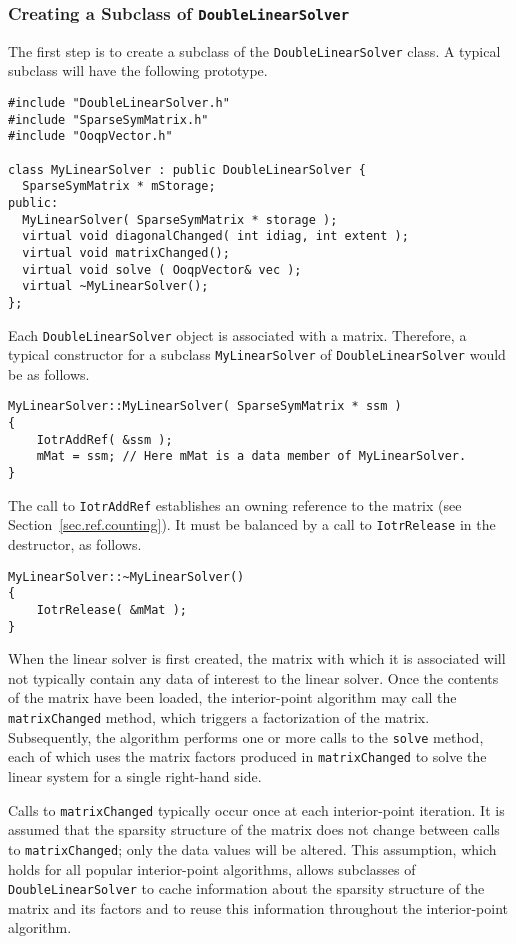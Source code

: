 \subsubsection{Creating a Subclass of {\tt DoubleLinearSolver}}
\label{sec.subclass.DoubleLinearSolver}

The first step is to create a subclass of the
\texttt{DoubleLinearSolver} class. A typical subclass will have the
following prototype.
\begin{verbatim}
#include "DoubleLinearSolver.h"
#include "SparseSymMatrix.h"
#include "OoqpVector.h"

class MyLinearSolver : public DoubleLinearSolver {
  SparseSymMatrix * mStorage;
public:
  MyLinearSolver( SparseSymMatrix * storage );
  virtual void diagonalChanged( int idiag, int extent );
  virtual void matrixChanged();
  virtual void solve ( OoqpVector& vec );
  virtual ~MyLinearSolver();
};
\end{verbatim}
Each \texttt{DoubleLinearSolver} object is associated with a matrix.
Therefore, a typical constructor for a subclass
\texttt{MyLinearSolver} of \texttt{DoubleLinearSolver} would be as
follows.
\begin{verbatim}
MyLinearSolver::MyLinearSolver( SparseSymMatrix * ssm )
{
    IotrAddRef( &ssm );
    mMat = ssm; // Here mMat is a data member of MyLinearSolver.
}
\end{verbatim}
The call to \texttt{IotrAddRef} establishes an owning reference to the
matrix (see Section~\ref{sec.ref.counting}). It must be balanced by a
call to \texttt{IotrRelease} in the destructor, as follows.
\begin{verbatim}
MyLinearSolver::~MyLinearSolver()
{
    IotrRelease( &mMat );
}
\end{verbatim}

When the linear solver is first created, the matrix with which it is
associated will not typically contain any data of interest to the
linear solver. Once the contents of the matrix have been loaded, the
interior-point algorithm may call the \texttt{matrixChanged} method,
which triggers a factorization of the matrix.  Subsequently, the
algorithm performs one or more calls to the \texttt{solve} method,
each of which uses the matrix factors produced in
\texttt{matrixChanged} to solve the linear system for a single
right-hand side.

Calls to \texttt{matrixChanged} typically occur once at each
interior-point iteration. It is assumed that the sparsity structure of
the matrix does not change between calls to \texttt{matrixChanged};
only the data values will be altered. This assumption, which holds for
all popular interior-point algorithms, allows subclasses of
\texttt{DoubleLinearSolver} to cache information about the sparsity
structure of the matrix and its factors and to reuse this information
throughout the interior-point algorithm.

